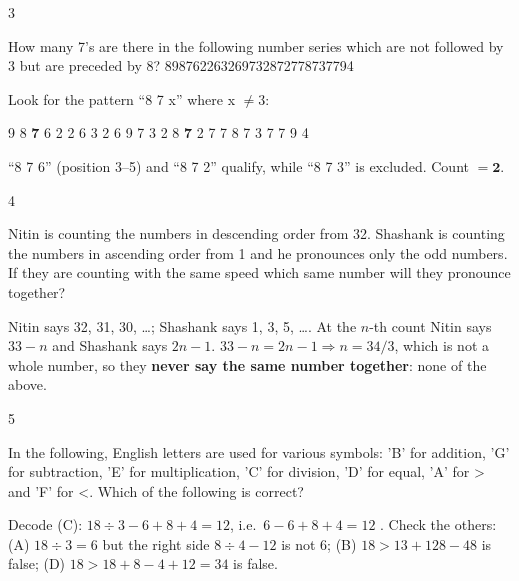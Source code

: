\begin{question}{3}
{How many 7's are there in the following number series which are not followed by 3 but are preceded by 8? 898762263269732872778737794\par}
\begin{explain}
Look for the pattern ``8 7 x'' where x $\neq 3$:
\begin{center} 9 8 \textbf{7} 6 2 2 6 3 2 6 9 7 3 2 8 \textbf{7} 2 7 7 8 7 3 7 7 9 4\end{center}
``8 7 6'' (position 3--5) and ``8 7 2'' qualify, while ``8 7 3'' is excluded. Count $=\mathbf{2}$.
\end{explain}
\end{question}

\begin{question}{4}
{Nitin is counting the numbers in descending order from 32. Shashank is counting the numbers in ascending order from 1 and he pronounces only the odd numbers. If they are counting with the same speed which same number will they pronounce together?\par}
\begin{explain}
Nitin says 32, 31, 30, \ldots; Shashank says 1, 3, 5, \ldots. At the $n$-th count Nitin says $33-n$ and Shashank says $2n-1$.
$33-n=2n-1\Rightarrow n=34/3$, which is not a whole number, so they \textbf{never say the same number together}: none of the above.
\end{explain}
\end{question}

\begin{question}{5}
{In the following, English letters are used for various symbols: 'B' for addition, 'G' for subtraction, 'E' for multiplication, 'C' for division, 'D' for equal, 'A' for > and 'F' for <. Which of the following is correct?\par}
\begin{explain}
Decode (C): $18\div3-6+8+4=12$, i.e.\ $6-6+8+4=12$ \checkmark.
Check the others: (A) $18\div3=6$ but the right side $8\div4-12$ is not 6; (B) $18>13+128-48$ is false; (D) $18>18+8-4+12=34$ is false.
\end{explain}
\end{question}

